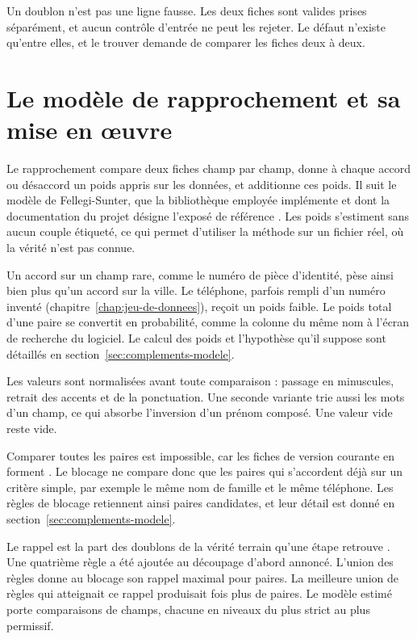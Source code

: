 Un doublon n'est pas une ligne fausse. Les deux fiches sont valides prises séparément, et aucun
contrôle d'entrée ne peut les rejeter. Le défaut n'existe qu'entre elles, et le trouver demande de
comparer les fiches deux à deux.

\section{Le modèle de rapprochement et sa mise en œuvre}

Le rapprochement compare deux fiches champ par champ, donne à chaque accord ou désaccord un poids
appris sur les données, et additionne ces poids. Il suit le modèle de Fellegi-Sunter, que la
bibliothèque employée implémente \cite{s22} et dont la documentation du projet désigne l'exposé de
référence \cite{s23}. Les poids s'estiment sans aucun couple étiqueté, ce qui permet d'utiliser la
méthode sur un fichier réel, où la vérité n'est pas connue.

Un accord sur un champ rare, comme le numéro de pièce d'identité, pèse ainsi bien plus qu'un accord
sur la ville. Le téléphone, parfois rempli d'un numéro inventé (chapitre~\ref{chap:jeu-de-donnees}),
reçoit un poids faible. Le poids total d'une paire se convertit en probabilité, comme la colonne du
même nom à l'écran de recherche du logiciel. Le calcul des poids et l'hypothèse qu'il suppose sont
détaillés en section~\ref{sec:complements-modele}.

Les valeurs sont normalisées avant toute comparaison : passage en minuscules, retrait des accents
et de la ponctuation. Une seconde variante trie aussi les mots d'un champ, ce qui absorbe
l'inversion d'un prénom composé. Une valeur vide reste vide.

Comparer toutes les paires est impossible, car les  fiches de version
courante en forment . Le blocage ne compare donc que les paires qui
s'accordent déjà sur un critère simple, par exemple le même nom de famille et le même téléphone.
Les  règles de blocage retiennent ainsi  paires candidates, et leur
détail est donné en section~\ref{sec:complements-modele}.

Le rappel est la part des doublons de la vérité terrain qu'une étape retrouve \cite{s51}. Une
quatrième règle a été ajoutée au découpage d'abord annoncé. L'union des  règles donne au blocage son
rappel maximal pour  paires. La meilleure union de  règles qui
atteignait ce rappel produisait  fois plus de paires. Le modèle estimé porte
 comparaisons de champs, chacune en niveaux du plus strict au plus
permissif.

